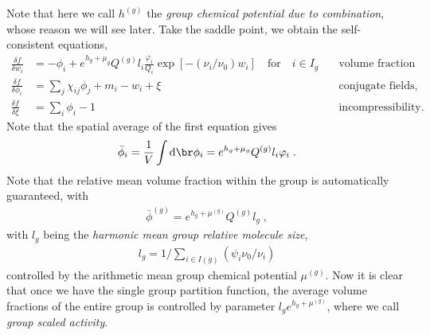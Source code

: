 \documentclass[aps,prl,reprint,onecolumn,groupedaddress,amsmath,amssymb]{revtex4-2}
\newcommand{\dd}{{\mathrm{d}}}
\newcommand{\bphi}{{\bar{\phi}}}
\begin{document}
Note that here we call $h^{(g)}$ the \emph{group chemical potential due to combination}, whose reason we will see later.
Take the saddle point, we obtain the self-consistent equations,
\begin{subequations}
    \begin{align}
        \frac{\delta f}{\delta w_i}    & = -\phi_i + e^{h_g + \mu_g} Q^{(g)} l_i \frac{ \varphi_i}{Q_i}\exp\left[-\left(\nu_i/\nu_0\right) w_i\right]  \quad \text{for} \quad i\in I_g \quad & \text{volume fraction fields,} \\
        \frac{\delta f}{\delta \phi_i} & = \sum_j \chi_{ij} \phi_j + m_i -w_i + \xi     \quad                                                                                                & \text{conjugate fields,}       \\
        \frac{\delta f}{\delta \xi}    & = \sum_i \phi_i -1     \quad                                                                                                                        & \text{incompressibility.}
    \end{align}
\end{subequations}
Note that the spatial average of the first equation gives
\begin{align}
    \bphi_i = \frac{1}{V} \int \dd \br \phi_i = e^{h_g + \mu_g} Q^{(g)} l_i \varphi_i \;.
\end{align}
Note that the relative mean volume fraction within the group is automatically guaranteed, with
\begin{align}
    \bphi^{(g)} =  e^{h_g + \mu^{(g)}} Q^{(g)} l_g \;,
\end{align}
with $l_g$ being the \emph{harmonic mean group relative molecule size},
\begin{align}
    l_g = 1/\sum_{i \in I(g)} \left(\psi_i \nu_0 / \nu_i\right)
\end{align}
controlled by the arithmetic mean group chemical potential $\mu^{(g)}$.
Now it is clear that once we have the single group partition function, the average volume fractions of the entire group is controlled by parameter $l_g e^{h_g + \mu^{(g)}}$, where we call \emph{group scaled activity}.
\end{document}
